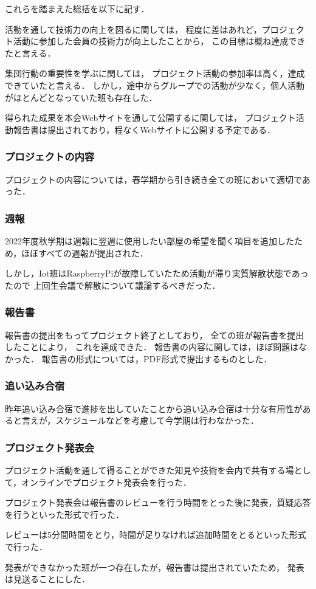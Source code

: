 これらを踏まえた総括を以下に記す．

活動を通して技術力の向上を図るに関しては，
程度に差はあれど，プロジェクト活動に参加した会員の技術力が向上したことから，
この目標は概ね達成できたと言える．

集団行動の重要性を学ぶに関しては，
プロジェクト活動の参加率は高く，達成できていたと言える．
しかし，途中からグループでの活動が少なく，個人活動がほとんどとなっていた班も存在した．

得られた成果を本会Webサイトを通して公開するに関しては，
プロジェクト活動報告書は提出されており，程なくWebサイトに公開する予定である．

\subsubsection*{プロジェクトの内容}
プロジェクトの内容については，春学期から引き続き全ての班において適切であった．

\subsubsection*{週報}
2022年度秋学期は週報に翌週に使用したい部屋の希望を聞く項目を追加したため，ほぼすべての週報が提出された．

しかし，Iot班はRaspberryPiが故障していたため活動が滞り実質解散状態であったので
上回生会議で解散について議論するべきだった．

\subsubsection*{報告書}

報告書の提出をもってプロジェクト終了としており，
全ての班が報告書を提出したことにより，
これを達成できた．
報告書の内容に関しては，ほぼ問題はなかった．
報告書の形式については，PDF形式で提出するものとした．

\subsubsection*{追い込み合宿}
昨年追い込み合宿で進捗を出していたことから追い込み合宿は十分な有用性があると言えが，スケジュールなどを考慮して今学期は行わなかった．

\subsubsection*{プロジェクト発表会}

プロジェクト活動を通して得ることができた知見や技術を会内で共有する場として，オンラインでプロジェクト発表会を行った．

プロジェクト発表会は報告書のレビューを行う時間をとった後に発表，質疑応答を行うといった形式で行った．

レビューは5分間時間をとり，時間が足りなければ追加時間をとるといった形式で行った．

発表ができなかった班が一つ存在したが，報告書は提出されていたため，
発表は見送ることにした．
